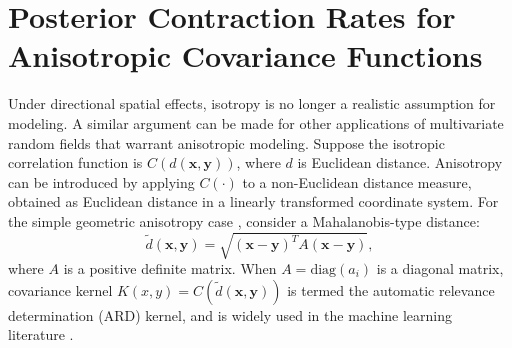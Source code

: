 \documentclass[ejs,noshowframe]{imsart}
\theoremstyle{plain}
\theoremstyle{definition}
\theoremstyle{remark}
\begin{document}
\section{Posterior Contraction Rates for Anisotropic  Covariance Functions}
\label{section4}
Under directional spatial effects, isotropy is no longer a realistic assumption for modeling. A similar argument can be made for other applications of multivariate random fields that warrant anisotropic modeling. Suppose the isotropic correlation function is $C(d(\bm{x},\bm{y}))$, where $d$ is Euclidean distance. Anisotropy can be introduced by applying $C(\cdot)$  to a non-Euclidean distance measure, obtained as Euclidean distance in a linearly transformed coordinate system. For the simple geometric anisotropy case \citep{haskard2007anisotropic,allard2016anisotropy},  consider a Mahalanobis-type distance: 
$$
\tilde{d}(\bm{x},\bm{y})=\sqrt{{(\bm{x}-\bm{y})}^TA{(\bm{x}-\bm{y})}},
$$
 where $A$ is a positive definite  matrix. When $A=\mathrm{diag}(a_i)$ is a diagonal matrix, covariance kernel $K(x,y)=C(\tilde{d}(\bm{x},\bm{y}))$ is termed the automatic relevance determination (ARD) kernel, and is widely used in the machine learning literature \citep{williams2006gaussian}.
\end{document}

